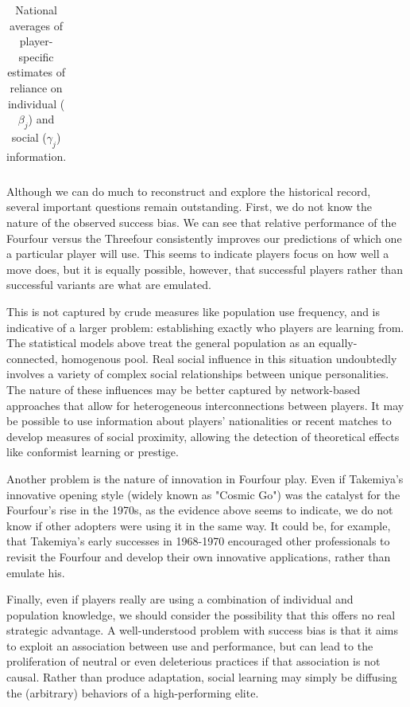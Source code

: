 \documentclass[reqno,12pt]{amsart}
\begin{document}
\begin{table}[t]
  \centering
    \begin{tabular}{lrrrrr}
    
    \end{tabular}
    \caption{National averages of player-specific estimates of reliance on individual ($\beta_j$) and social ($\gamma_j$) information.}
    \label{table:national_coef_averages}
\end{table}

Although we can do much to reconstruct and explore the historical record, several important questions remain outstanding. First, we do not know the nature of the observed success bias. We can see that relative performance of the Fourfour versus the Threefour consistently improves our predictions of which one a particular player will use. This seems to indicate players focus on how well a move does, but it is equally possible, however, that successful players rather than successful variants are what are emulated.

This is not captured by crude measures like population use frequency, and is indicative of a larger problem: establishing exactly who players are learning from. The statistical models above treat the general population as an equally-connected, homogenous pool. Real social influence in this situation undoubtedly involves a variety of complex social relationships between unique personalities. The nature of these influences may be better captured by network-based approaches that allow for heterogeneous interconnections between players. It may be possible to use information about players' nationalities or recent matches to develop measures of social proximity, allowing the detection of theoretical effects like conformist learning or prestige.

Another problem is the nature of innovation in Fourfour play. Even if Takemiya's innovative opening style (widely known as "Cosmic Go") was the catalyst for the Fourfour's rise in the 1970s, as the evidence above seems to indicate, we do not know if other adopters were using it in the same way. It could be, for example, that Takemiya's early successes in 1968-1970 encouraged other professionals to revisit the Fourfour and develop their own innovative applications, rather than emulate his.

Finally, even if players really are using a combination of individual and population knowledge, we should consider the possibility that this offers no real strategic advantage. A well-understood problem with success bias is that it aims to exploit an association between use and performance, but can lead to the proliferation of neutral or even deleterious practices if that association is not causal. Rather than produce adaptation, social learning may simply be diffusing the (arbitrary) behaviors of a high-performing elite.
\end{document}
